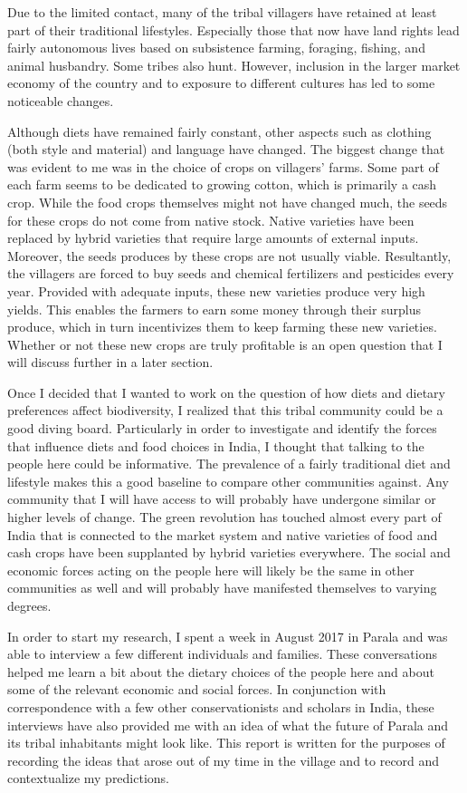 \documentclass{article}
\begin{document}
Due to the limited contact, many of the tribal villagers have retained at least part of their traditional lifestyles. Especially those that now have land rights lead fairly autonomous lives based on subsistence farming, foraging, fishing, and animal husbandry. Some tribes also hunt. However, inclusion in the larger market economy of the country and to exposure to different cultures has led to some noticeable changes.

Although diets have remained fairly constant, other aspects such as clothing (both style and material) and language have changed. The biggest change that was evident to me was in the choice of crops on villagers' farms. Some part of each farm seems to be dedicated to growing cotton, which is primarily a cash crop. While the food crops themselves might not have changed much, the seeds for these crops do not come from native stock. Native varieties have been replaced by hybrid varieties that require large amounts of external inputs. Moreover, the seeds produces by these crops are not usually viable. Resultantly, the villagers are forced to buy seeds and chemical fertilizers and pesticides every year. Provided with adequate inputs, these new varieties produce very high yields. This enables the farmers to earn some money through their surplus produce, which in turn incentivizes them to keep farming these new varieties. Whether or not these new crops are truly profitable is an open question that I will discuss further in a later section.

Once I decided that I wanted to work on the question of how diets and dietary preferences affect biodiversity, I realized that this tribal community could be a good diving board. Particularly in order to investigate and identify the forces that influence diets and food choices in India, I thought that talking to the people here could be informative. The prevalence of a fairly traditional diet and lifestyle makes this a good baseline to compare other communities against. Any community that I will have access to will probably have undergone similar or higher levels of change. The green revolution has touched almost every part of India that is connected to the market system and native varieties of food and cash crops have been supplanted by hybrid varieties everywhere. The social and economic forces acting on the people here will likely be the same in other communities as well and will probably have manifested themselves to varying degrees.

In order to start my research, I spent a week in August 2017 in Parala and was able to interview a few different individuals and families. These conversations helped me learn a bit about the dietary choices of the people here and about some of the relevant economic and social forces. In conjunction with correspondence with a few other conservationists and scholars in India, these interviews have also provided me with an idea of what the future of Parala and its tribal inhabitants might look like. This report is written for the purposes of recording the ideas that arose out of my time in the village and to record and contextualize my predictions.
\end{document}
